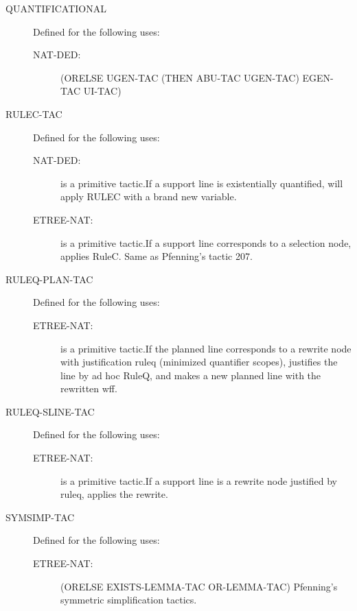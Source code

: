 \begin{description}
\begin{description}
\end{description}

\item[QUANTIFICATIONAL]  Defined for the following uses:
\begin{description}
\item[NAT-DED:] 
(ORELSE UGEN-TAC (THEN ABU-TAC UGEN-TAC) EGEN-TAC UI-TAC)


\end{description}

\item[RULEC-TAC]  Defined for the following uses:
\begin{description}
\item[NAT-DED:]  is a primitive tactic.If a support line is existentially quantified, will apply RULEC
with a brand new variable.

\item[ETREE-NAT:]  is a primitive tactic.If a support line corresponds to a selection node, applies 
RuleC.  Same as Pfenning's tactic 207.

\end{description}

\item[RULEQ-PLAN-TAC]  Defined for the following uses:
\begin{description}
\item[ETREE-NAT:]  is a primitive tactic.If the planned line corresponds to a rewrite node with justification
ruleq (minimized quantifier scopes), justifies the line by ad hoc RuleQ,
and makes a new planned line with the rewritten wff.

\end{description}

\item[RULEQ-SLINE-TAC]  Defined for the following uses:
\begin{description}
\item[ETREE-NAT:]  is a primitive tactic.If a support line is a rewrite node justified by ruleq, applies
the rewrite.

\end{description}

\item[SYMSIMP-TAC]  Defined for the following uses:
\begin{description}
\item[ETREE-NAT:] 
(ORELSE EXISTS-LEMMA-TAC OR-LEMMA-TAC)
Pfenning's symmetric simplification tactics.


\end{description}
\end{description}
